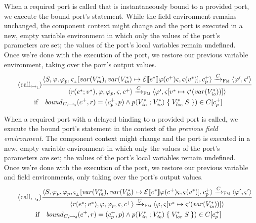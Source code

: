 \documentclass[a4paper,10pt,english]{article}
\begin{document}
When a required port is called that is instantaneously bound to a provided port, we execute the bound port's statement.
While the field environment remains unchanged, the component context might change and the port is executed in a new, empty
variable environment in which only the values of the port's parameters are set; the values of the port's local variables remain undefined. Once we're
done with the execution of the port, we restore our previous variable environment, taking over the port's output values.
\begin{multline*}
	\tag{call${_\instantBinding}$}
	\dfrac
	{
		\configurationFm{\stmFm, \fieldEnv, \fieldEnvOld, \varEnvFmEmpty[\varof(\toList{\varDecl}_\mathit{in}),
		\varof(\toList{\varDecl}_\mathit{io}) \mapsto \ExprSem{\toList{\expr}}\fieldEnv(\toListNE{\comp})\varEnvFm, \varEnvFm(\toList{\var})],
		\toListNE{\comp}_\provPort}
			\stmArrowFm
		\configurationFm{\fieldEnv', \varEnvFm'}
	}
	{
		\configurationFm{\invokePort{\reqPort}{\toList{\expr}}{\toList{\var}}, \fieldEnv, \fieldEnvOld, \varEnvFm, \toListNE{\comp}}
			\stmArrowFm
		\configurationFm{\fieldEnv', \varEnvFm[\toList{\var} \mapsto \varEnvFm'(\varof(\toList{\varDecl_\mathit{io}}))]}
	}
	\\ \text{if} \quad \boundof_{\compDecl, \instantBinding}(\toListNE{\comp},
	\reqPort) = (\toListNE{\comp}_\provPort, \provPort) \wedge
	\provPortDeclSyn{\provPort}{\toList{\varDecl_\mathit{in}}}{\toList{\varDecl_\mathit{io}}}{\toList{\varDecl_\mathit{loc}}}{\stmFm})
	\in \compDecl[\toListNE{\comp}_\provPort]
\end{multline*}

When a required port with a delayed binding to a provided port is called, we execute the bound port's statement in the context of
the \textit{previous field environment}. The component context might change and the port is executed in a new, empty
variable environment in which only the values of the port's parameters are set; the values of the port's local variables remain undefined. Once we're
done with the execution of the port, we restore our previous variable and field environments, only taking over the port's output
values.
\begin{multline*}
	\tag{call${_\delayedBinding}$}
	\dfrac
	{
		\configurationFm{\stmFm, \fieldEnvOld, \fieldEnvOld, \varEnvFmEmpty[\varof(\toList{\varDecl}_\mathit{in}),
		\varof(\toList{\varDecl}_\mathit{io}) \mapsto \ExprSem{\toList{\expr}}\fieldEnv(\toListNE{\comp})\varEnvFm, \varEnvFm(\toList{\var})],
		\toListNE{\comp}_\provPort}
			\stmArrowFm
		\configurationFm{\fieldEnv', \varEnvFm'}
	}
	{
		\configurationFm{\invokePort{\reqPort}{\toList{\expr}}{\toList{\var}}, \fieldEnv, \fieldEnvOld, \varEnvFm, \toListNE{\comp}}
			\stmArrowFm
		\configurationFm{\fieldEnv, \varEnvFm[\toList{\var} \mapsto \varEnvFm'(\varof(\toList{\varDecl_\mathit{io}}))]}
	}
	\\ \text{if} \quad \boundof_{\compDecl, \delayedBinding}(\toListNE{\comp},
	\reqPort) = (\toListNE{\comp}_\provPort, \provPort) \wedge
	\provPortDeclSyn{\provPort}{\toList{\varDecl_\mathit{in}}}{\toList{\varDecl_\mathit{io}}}{\toList{\varDecl_\mathit{loc}}}{\stmFm})
	\in \compDecl[\toListNE{\comp}_\provPort]
\end{multline*}
\end{document}
